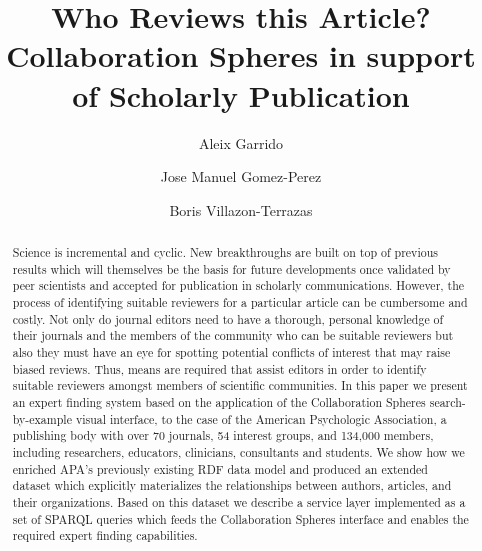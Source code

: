 \documentclass{llncs}
\begin{document}
%
\frontmatter          %
%
\pagestyle{headings}  %
%
%
\mainmatter              %
%
\title{Who Reviews this Article? Collaboration Spheres in support of Scholarly Publication}

%
%
\author{Aleix Garrido \and Jose Manuel Gomez-Perez \and Boris Villazon-Terrazas}
%
%
%


\maketitle              %



\begin{abstract}
Science is incremental and cyclic. New breakthroughs are built on top of previous results which will themselves be the basis for future developments once validated by peer scientists and accepted for publication in scholarly communications. However, the process of identifying suitable reviewers for a particular article can be cumbersome and costly. Not only do journal editors need to have a thorough, personal knowledge of their journals and the members of the community who can be suitable reviewers but also they must have an eye for spotting potential conflicts of interest that may raise biased reviews. Thus, means are required that assist editors in order to identify suitable reviewers amongst members of scientific communities. In this paper we present an expert finding system based on the application of the Collaboration Spheres search-by-example visual interface, to the case of the American Psychologic Association, a publishing body with over 70 journals, 54 interest groups, and 134,000 members, including researchers, educators, clinicians, consultants and students. We show how we enriched APA's previously existing RDF data model and produced an extended dataset which explicitly materializes the relationships between authors, articles, and their organizations. Based on this dataset we describe a service layer implemented as a set of SPARQL queries which feeds the Collaboration Spheres interface and enables the required expert finding capabilities. 
\end{abstract}
\end{document}
